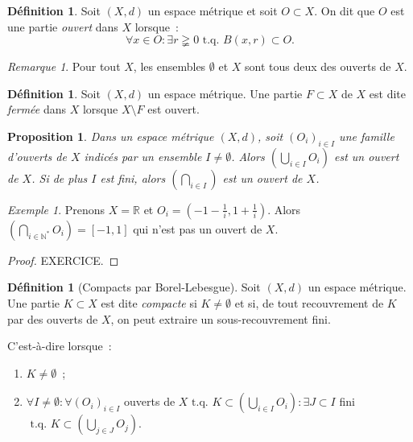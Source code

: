 \documentclass{report}
\newtheorem{prp}[thm]{Proposition}
\theoremstyle{definition}
\newtheorem{déf}[thm]{Définition}
\theoremstyle{remark}
\newtheorem*{rmq}{Remarque}
\newtheorem{ex}{Exemple}[chapter]
\newcommand{\R}{\mathbb R}
\newcommand{\N}{\mathbb N}
\newcommand{\Ns}{\N^{*}}
\newcommand{\tq}{\text{ t.q. }}
\newcommand{\seq}[3]{\left(#1_{#2}\right)_{#2 \in #3}}
\begin{document}
				\begin{déf} Soit $(X, d)$ un espace métrique et soit $O \subset X$. On dit que $O$ est une partie \textit{ouvert} dans $X$ lorsque~:
				\[\forall x \in O : \exists r \gneqq 0 \tq B(x, r)  \subset O.\]
				\end{déf}

				\begin{rmq} Pour tout $X$, les ensembles $\emptyset$ et $X$ sont tous deux des ouverts de $X$. \end{rmq}

				\begin{déf} Soit $(X, d)$ un espace métrique. Une partie $F \subset X$  de $X$ est dite \textit{fermée} dans $X$ lorsque $X \setminus F$
				est ouvert. \end{déf}

				\begin{prp} Dans un espace métrique $(X, d)$, soit $\seq OiI$ une famille d'ouverts de $X$ indicés par un ensemble $I \neq \emptyset$.
				Alors $\left(\bigcup_{i \in I}O_i\right)$ est un ouvert de $X$. Si de plus $I$ est fini, alors $\left(\bigcap_{i \in I}\right)$ est
				un ouvert de $X$. \end{prp}

				\begin{ex} Prenons $X = \R$ et $O_i = (-1-\frac 1i, 1 + \frac 1i)$. Alors $\left(\bigcap_{i \in \Ns}O_i\right) = [-1, 1]$ qui n'est pas
				un ouvert de $X$. \end{ex}

				\begin{proof} EXERCICE.
				\end{proof}

				\begin{déf}[Compacts par Borel-Lebesgue] Soit $(X, d)$ un espace métrique. Une partie $K \subset X$ est dite \textit{compacte} si
				$K \neq \emptyset$ et si, de tout recouvrement de $K$ par des ouverts de $X$, on peut extraire un sous-recouvrement fini.

				C'est-à-dire lorsque~:
				\begin{enumerate}
					\item $K \neq \emptyset$~;
					\item $\forall I \neq \emptyset : \forall \seq OiI$ ouverts de $X \tq K \subset \left(\bigcup_{i \in I}O_i\right) : \exists J \subset I$
					      fini $\tq K \subset \left(\bigcup_{j \in J}O_j\right)$.
				\end{enumerate}
				\end{déf}
\end{document}

